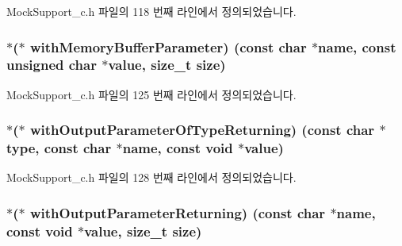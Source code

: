 Mock\+Support\+\_\+c.\+h 파일의 118 번째 라인에서 정의되었습니다.

\subsubsection[{\texorpdfstring{with\+Memory\+Buffer\+Parameter}{withMemoryBufferParameter}}]{$\ast$($\ast$ with\+Memory\+Buffer\+Parameter) (const char $\ast$name, const unsigned char $\ast$value, size\+\_\+t {\bf size})}\hypertarget{struct_s_mock_expected_call__c_a8037dec6cd064a4964534f44e85c08bf}{}\label{struct_s_mock_expected_call__c_a8037dec6cd064a4964534f44e85c08bf}


Mock\+Support\+\_\+c.\+h 파일의 125 번째 라인에서 정의되었습니다.

\subsubsection[{\texorpdfstring{with\+Output\+Parameter\+Of\+Type\+Returning}{withOutputParameterOfTypeReturning}}]{$\ast$($\ast$ with\+Output\+Parameter\+Of\+Type\+Returning) (const char $\ast$type, const char $\ast$name, const void $\ast$value)}\hypertarget{struct_s_mock_expected_call__c_ae916b4386cf32db678e524e709d6598c}{}\label{struct_s_mock_expected_call__c_ae916b4386cf32db678e524e709d6598c}


Mock\+Support\+\_\+c.\+h 파일의 128 번째 라인에서 정의되었습니다.

\subsubsection[{\texorpdfstring{with\+Output\+Parameter\+Returning}{withOutputParameterReturning}}]{$\ast$($\ast$ with\+Output\+Parameter\+Returning) (const char $\ast$name, const void $\ast$value, size\+\_\+t {\bf size})}\hypertarget{struct_s_mock_expected_call__c_ada2fe997394a7a5db49c70c63fde6d1d}{}\label{struct_s_mock_expected_call__c_ada2fe997394a7a5db49c70c63fde6d1d}


